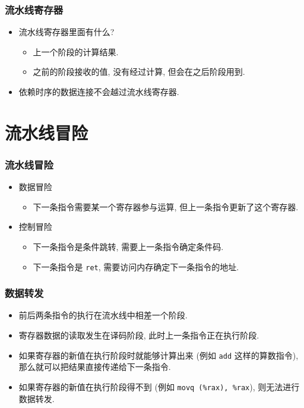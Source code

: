 \documentclass{ctexbeamer}
\newcommand{\ftitle}[1]{\frametitle{\hspace{4ex} {#1}}}
\begin{document}
\begin{frame}
    \ftitle{流水线寄存器}
    \begin{itemize}
        \item 流水线寄存器里面有什么?
              \begin{itemize}
                  \item 上一个阶段的计算结果.
                  \item 之前的阶段接收的值, 没有经过计算, 但会在之后阶段用到.
              \end{itemize}
        \item 依赖时序的数据连接不会越过流水线寄存器.
    \end{itemize}
\end{frame}

\section{流水线冒险}
\begin{frame}
    \ftitle{流水线冒险}
    \begin{itemize}
        \item 数据冒险
              \begin{itemize}
                  \item 下一条指令需要某一个寄存器参与运算, 但上一条指令更新了这个寄存器.
              \end{itemize}
        \item 控制冒险
              \begin{itemize}
                  \item 下一条指令是条件跳转, 需要上一条指令确定条件码.
                  \item 下一条指令是 \texttt{ret}, 需要访问内存确定下一条指令的地址.
              \end{itemize}
    \end{itemize}
\end{frame}

\begin{frame}
    \ftitle{数据转发}
    \begin{itemize}
        \item 前后两条指令的执行在流水线中相差一个阶段.
        \item 寄存器数据的读取发生在译码阶段, 此时上一条指令正在执行阶段.
        \item 如果寄存器的新值在执行阶段时就能够计算出来
        (例如 \texttt{add} 这样的算数指令), 
        那么就可以把结果直接传递给下一条指令.
        \item 如果寄存器的新值在执行阶段得不到
        (例如 \texttt{movq (\%rax), \%rax}),
        则无法进行数据转发.
    \end{itemize}
\end{frame}
\end{document}
